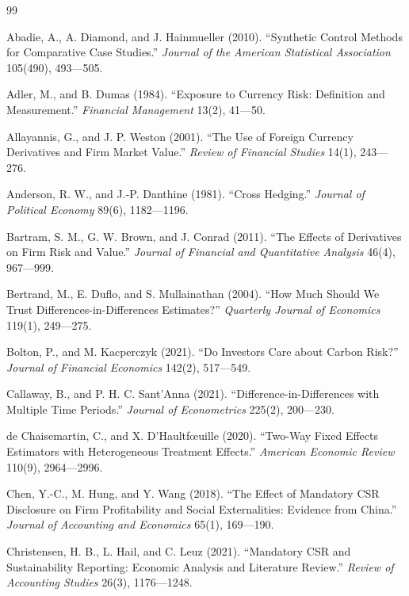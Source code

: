 \documentclass[11pt,a4paper]{article}
\begin{document}
\clearpage
\begin{thebibliography}{99}

 Abadie, A., A. Diamond, and J. Hainmueller (2010). ``Synthetic Control Methods for Comparative Case Studies.'' \emph{Journal of the American Statistical Association} 105(490), 493---505.

 Adler, M., and B. Dumas (1984). ``Exposure to Currency Risk: Definition and Measurement.'' \emph{Financial Management} 13(2), 41---50.

 Allayannis, G., and J. P. Weston (2001). ``The Use of Foreign Currency Derivatives and Firm Market Value.'' \emph{Review of Financial Studies} 14(1), 243---276.

 Anderson, R. W., and J.-P. Danthine (1981). ``Cross Hedging.'' \emph{Journal of Political Economy} 89(6), 1182---1196.

 Bartram, S. M., G. W. Brown, and J. Conrad (2011). ``The Effects of Derivatives on Firm Risk and Value.'' \emph{Journal of Financial and Quantitative Analysis} 46(4), 967---999.

 Bertrand, M., E. Duflo, and S. Mullainathan (2004). ``How Much Should We Trust Differences-in-Differences Estimates?'' \emph{Quarterly Journal of Economics} 119(1), 249---275.

 Bolton, P., and M. Kacperczyk (2021). ``Do Investors Care about Carbon Risk?'' \emph{Journal of Financial Economics} 142(2), 517---549.

 Callaway, B., and P. H. C. Sant'Anna (2021). ``Difference-in-Differences with Multiple Time Periods.'' \emph{Journal of Econometrics} 225(2), 200---230.

 de Chaisemartin, C., and X. D'Haultf\oe uille (2020). ``Two-Way Fixed Effects Estimators with Heterogeneous Treatment Effects.'' \emph{American Economic Review} 110(9), 2964---2996.

 Chen, Y.-C., M. Hung, and Y. Wang (2018). ``The Effect of Mandatory CSR Disclosure on Firm Profitability and Social Externalities: Evidence from China.'' \emph{Journal of Accounting and Economics} 65(1), 169---190.

 Christensen, H. B., L. Hail, and C. Leuz (2021). ``Mandatory CSR and Sustainability Reporting: Economic Analysis and Literature Review.'' \emph{Review of Accounting Studies} 26(3), 1176---1248.


\end{thebibliography}
\end{document}
